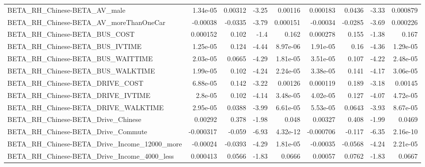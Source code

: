 \begin{tabular}{lrrrrrrrr}
BETA\_RH\_Chinese-BETA\_AV\_male                       &    1.34e-05 &      0.00312 &     -3.25 &  0.00116 &   0.000183 &      0.0436 &        -3.33 &      0.000879 \\
BETA\_RH\_Chinese-BETA\_AV\_moreThanOneCar             &    -0.00038 &      -0.0335 &     -3.79 & 0.000151 &   -0.00034 &     -0.0285 &        -3.69 &      0.000226 \\
BETA\_RH\_Chinese-BETA\_BUS\_COST                      &    0.000152 &        0.102 &      -1.4 &    0.162 &   0.000278 &       0.155 &        -1.38 &         0.167 \\
BETA\_RH\_Chinese-BETA\_BUS\_IVTIME                    &    1.25e-05 &        0.124 &     -4.44 & 8.97e-06 &   1.91e-05 &        0.16 &        -4.36 &      1.29e-05 \\
BETA\_RH\_Chinese-BETA\_BUS\_WAITTIME                  &    2.03e-05 &       0.0665 &     -4.29 & 1.81e-05 &   3.51e-05 &       0.107 &        -4.22 &      2.48e-05 \\
BETA\_RH\_Chinese-BETA\_BUS\_WALKTIME                  &    1.99e-05 &        0.102 &     -4.24 & 2.24e-05 &   3.38e-05 &       0.141 &        -4.17 &      3.06e-05 \\
BETA\_RH\_Chinese-BETA\_DRIVE\_COST                    &    6.88e-05 &        0.142 &     -3.22 &  0.00126 &   0.000119 &       0.189 &        -3.18 &       0.00145 \\
BETA\_RH\_Chinese-BETA\_DRIVE\_IVTIME                  &     2.8e-05 &        0.102 &     -4.14 & 3.48e-05 &   4.02e-05 &       0.127 &        -4.07 &      4.72e-05 \\
BETA\_RH\_Chinese-BETA\_DRIVE\_WALKTIME                &    2.95e-05 &       0.0388 &     -3.99 & 6.61e-05 &   5.53e-05 &      0.0643 &        -3.93 &      8.67e-05 \\
BETA\_RH\_Chinese-BETA\_Drive\_Chinese                 &     0.00292 &        0.378 &     -1.98 &    0.048 &    0.00327 &       0.408 &        -1.99 &        0.0469 \\
BETA\_RH\_Chinese-BETA\_Drive\_Commute                 &   -0.000317 &       -0.059 &     -6.93 & 4.32e-12 &  -0.000706 &      -0.117 &        -6.35 &      2.16e-10 \\
BETA\_RH\_Chinese-BETA\_Drive\_Income\_12000\_more       &    -0.00024 &      -0.0393 &     -4.29 & 1.81e-05 &   -0.00035 &     -0.0568 &        -4.24 &      2.21e-05 \\
BETA\_RH\_Chinese-BETA\_Drive\_Income\_4000\_less        &    0.000413 &       0.0566 &     -1.83 &   0.0666 &    0.00057 &      0.0762 &        -1.83 &        0.0667 \\

\end{tabular}
